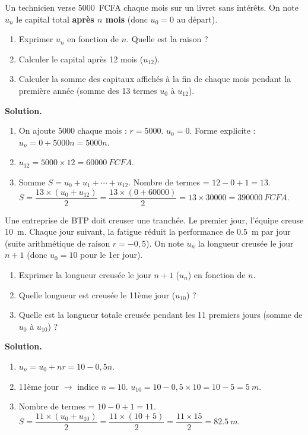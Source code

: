 \documentclass[11pt]{article}
\begin{document}
\begin{exemplebox}
Un technicien verse \SI{5000}{FCFA} chaque mois sur un livret sans intérêts. On note $u_n$ le capital total \textbf{après $n$ mois} (donc $u_0 = 0$ au départ).
\begin{enumerate}
\item Exprimer $u_n$ en fonction de $n$. Quelle est la raison ?
\item Calculer le capital après 12 mois ($u_{12}$).
\item Calculer la somme des capitaux affichés à la fin de chaque mois pendant la première année (somme des 13 termes $u_0$ à $u_{12}$).
\end{enumerate}
\tcblower
\textbf{Solution.}
\begin{enumerate}
\item On ajoute 5000 chaque mois : $r = 5000$. $u_0 = 0$. Forme explicite : $u_n = 0 + 5000n = 5000n$.
\item $u_{12} = 5000 \times 12 = \SI{60000}{FCFA}$.
\item Somme $S = u_0 + u_1 + \cdots + u_{12}$.
Nombre de termes = $12 - 0 + 1 = 13$.
$S = \dfrac{13 \times (u_0 + u_{12})}{2} = \dfrac{13 \times (0 + 60000)}{2} = 13 \times 30000 = \SI{390000}{FCFA}$.
\end{enumerate}
\end{exemplebox}

\begin{exoresolu}
Une entreprise de BTP doit creuser une tranchée. Le premier jour, l'équipe creuse \SI{10}{m}. Chaque jour suivant, la fatigue réduit la performance de \SI{0,5}{m} par jour (suite arithmétique de raison $r = -0,5$).
On note $u_n$ la longueur creusée le jour $n+1$ (donc $u_0 = 10$ pour le 1er jour).
\begin{enumerate}
\item Exprimer la longueur creusée le jour $n+1$ ($u_n$) en fonction de $n$.
\item Quelle longueur est creusée le 11ème jour ($u_{10}$) ?
\item Quelle est la longueur totale creusée pendant les 11 premiers jours (somme de $u_0$ à $u_{10}$) ?
\end{enumerate}
\tcblower
\textbf{Solution.}
\begin{enumerate}
\item $u_n = u_0 + n r = 10 - 0,5 n$.
\item 11ème jour $\rightarrow$ indice $n=10$. $u_{10} = 10 - 0,5 \times 10 = 10 - 5 = \SI{5}{m}$.
\item Nombre de termes = $10 - 0 + 1 = 11$.
$S = \dfrac{11 \times (u_0 + u_{10})}{2} = \dfrac{11 \times (10 + 5)}{2} = \dfrac{11 \times 15}{2} = \SI{82,5}{m}$.
\end{enumerate}
\end{exoresolu}
\end{document}

